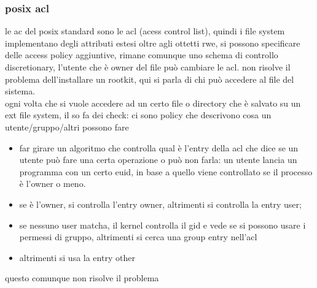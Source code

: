\documentclass[12pt, oneside]{extbook} %
\begin{document}
\subsubsection{posix acl}
le ac del posix standard sono le acl (acess control list), quindi i file system implementano degli attributi estesi oltre agli ottetti rwe, si possono specificare delle access policy aggiuntive, rimane comunque uno schema di controllo discretionary, l'utente che è owner del file può cambiare le acl. non risolve il problema dell'installare un rootkit, qui si parla di chi può accedere al file del sistema.\\ ogni volta che si vuole accedere ad un certo file o directory che è salvato su un ext file system, il so fa dei check: ci sono policy che descrivono cosa un utente/gruppo/altri possono fare
\begin{itemize}
\item far girare un algoritmo che controlla qual è l'entry della acl che dice se un utente può fare una certa operazione o può non farla: un utente lancia un programma con un certo euid, in base a quello viene controllato se il processo è l'owner o meno.
\item se è l'owner, si controlla l'entry owner, altrimenti si controlla la entry user;
\item se nessuno user matcha, il kernel controlla il gid e vede se si possono usare i permessi di gruppo, altrimenti si cerca una group entry nell'acl
\item altrimenti si usa la entry other
\end{itemize}
questo comunque non risolve il problema
\end{document}
